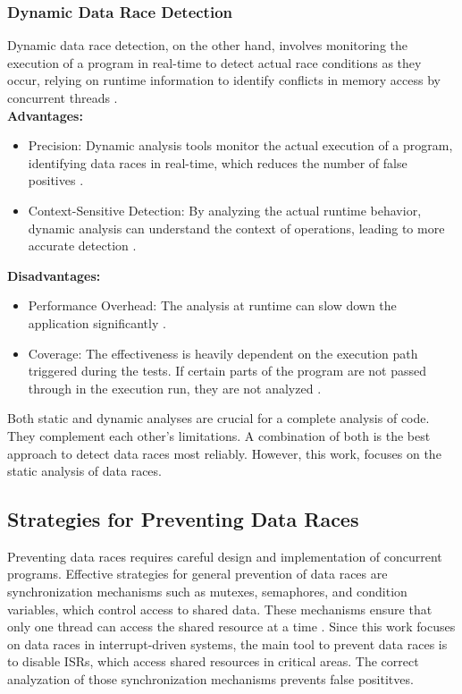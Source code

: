 \documentclass[
fancyheadings, %
%
%
]{stsreprt}
\begin{document}
{		\subsubsection{Dynamic Data Race Detection}
		Dynamic data race detection, on the other hand, involves monitoring the execution of a program in real-time to detect actual race conditions as they occur, relying on runtime information to identify conflicts in memory access by concurrent threads \cite{engler2003}. \\
		\textbf{Advantages:}
		\begin{itemize}
			\item Precision: Dynamic analysis tools monitor the actual execution of a program, identifying data races in real-time, which reduces the number of false positives \cite{engler2003}.
			\item Context-Sensitive Detection: By analyzing the actual runtime behavior, dynamic analysis can understand the context of operations, leading to more accurate detection \cite{engler2003}.
		\end{itemize}
		\textbf{Disadvantages:}
		\begin{itemize}
			\item Performance Overhead: The analysis at runtime can slow down the application significantly \cite{chen2011}.
			\item Coverage: The effectiveness is heavily dependent on the execution path triggered during the tests. If certain parts of the program are not passed through in the execution run, they are not analyzed \cite{engler2003}.
		\end{itemize}
		
		Both static and dynamic analyses are crucial for a complete analysis of code. They complement each other's limitations. A combination of both is the best approach to detect data races most reliably.\cite{engler2003} However, this work, focuses on the static analysis of data races.
		
		\subsection{Strategies for Preventing Data Races}
		
		Preventing data races requires careful design and implementation of concurrent programs. Effective strategies for general prevention of data races are synchronization mechanisms such as mutexes, semaphores, and condition variables, which control access to shared data. These mechanisms ensure that only one thread can access the shared resource at a time \cite{herlihy2008}. Since this work focuses on data races in interrupt-driven systems, the main tool to prevent data races is to disable \acp{ISR}, which access shared resources in critical areas. The correct analyzation of those synchronization mechanisms prevents false posititves.
		\begin{figure}[H]
		

\end{figure}}
\end{document}
